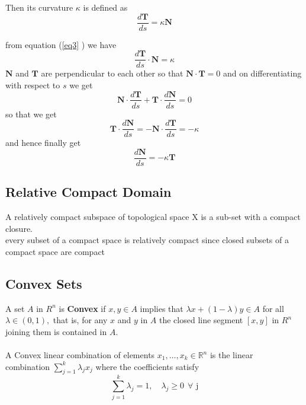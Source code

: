 \documentclass[oneside]{book}
\begin{document}
	Then its curvature $\kappa$ is defined as
	\begin{equation}
	\label{eq3}  
	\frac{d \mathbf{T}}{d s}=\kappa \mathbf{N}
	\end{equation}  
	
	from equation (\ref{eq3} ) we have
	$$ \frac{d \mathbf{T}}{d s} \cdot \mathbf{N} = \kappa $$
	$\mathbf{N}$ and $\mathbf{T}$ are perpendicular to each other so that $\mathbf{N} \cdot \mathbf{T} = 0 $
	and on differentiating with respect to $s$ we get 
	$$ \mathbf{N} \cdot \frac{d \mathbf{T}}{d s} + \mathbf{T} \cdot \frac{d \mathbf{N}}{d s} = 0 $$ 
	so that we get
	\hfill \break  
	$$ \mathbf{T} \cdot \frac{d \mathbf{N}}{d s} = -  \mathbf{N} \cdot \frac{d \mathbf{T}}{d s} = -\kappa  $$ 
	and hence finally get 
	\begin{equation}
	\label{eq4}  
	\frac{d \mathbf{N}}{d s}=-\kappa \mathbf{T}
	\end{equation}
	
	\subsection{Relative Compact Domain} \label{ss:2}
	A relatively compact  subspace of topological space X is a sub-set with a compact closure. \\
	every subset of a compact space is relatively compact since closed subsets of a compact space are compact
	
	
	
	
	
	
	
	
	
	
	
	
	
	
	\subsection{Convex Sets}
	\label{ss:3}
	A set $A$ in $R^{n}$ is \textbf{Convex} if $x, y \in A$ implies that $\lambda x+(1-\lambda) y \in A$
	for all $\lambda \in(0,1),$ that is, for any $x$ and $y$ in $A$ the closed line segment $[x, y]$ in
	$R^{n}$ joining them is contained in $A .$\\~\\
	
	A Convex linear combination of elements $x_{1}, \ldots, x_{k} \in \mathbb{R}^{n}$ is the linear \\combination
	$
	\sum_{j=1}^{k} \lambda_{j} x_{j}
	$
	where the coefficients satisfy
	\[
	\sum_{j=1}^{k} \lambda_{j}=1, \quad \lambda_{j} \geq 0 \hspace{5pt} \forall   \hspace{4pt} \text{j} 
	\]
	
\end{document}
